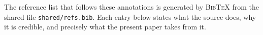%
%

The reference list that follows these annotations is generated by
\textsc{BibTeX} from the shared file \texttt{shared/refs.bib}. Each entry below
states what the source does, why it is credible, and precisely what the present
paper takes from it.

